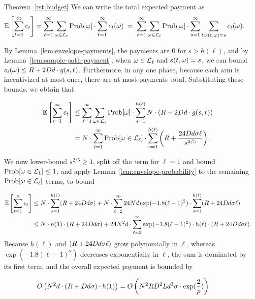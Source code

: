 \begin{extraproof}{Theorem~\ref{rst:budget}}
We can write the total expected payment as
\begin{align*}
  \Expect{\sum_{t=1}^{\infty} \PayA{t}}
& = \sum_{\ell = 1}^{\infty} \sum_{\SP \in \Env{\ell}}
  \Prob{\SP} \cdot \sum_{t=1}^{\infty} \PayA{t}(\SP)
\; = \; \sum_{\ell = 1}^{\infty} \sum_{\SP \in \Env{\ell}}
  \Prob{\SP} \cdot \sum_{s=1}^{\infty} \sum_{t: s(t,\SP) = s} \PayA{t}(\SP).
\end{align*}

By Lemma~\ref{lem:envelope-payments},
the payments are 0 for $s > h(\ell)$,
and by Lemma~\ref{lem:sample-path-payment},
when $\omega \in {\mathcal L}_{\ell}$ and $s(t,\omega) = s$, we can bound
$c_{t}(\omega) \leq R + 2 D d \cdot g(s,\ell)$.
Furthermore, in any one phase, because each arm is incentivized at
most once, there are at most \ARMNUM payments total.
Substituting these bounds, we obtain that

\begin{align*}
  \Expect{\sum_{t=1}^{\infty} \PayA{t}}
& \leq \sum_{\ell = 1}^{\infty} \sum_{\SP \in \Env{\ell}} \Prob{\SP} \cdot
  \sum_{s=1}^{h(\ell)} \ARMNUM \cdot (\MAXR + 2 \Diam d \cdot g(s,\ell))
\\ & = \ARMNUM \cdot
  \sum_{\ell = 1}^{\infty} \Prob{\SP \in \Env{\ell}} \cdot
  \sum_{s=1}^{h(\ell)} \left( \MAXR + \frac{24 \Diam d \sigma \ell}{s^{2/5}} \right).
\end{align*}

We now lower-bound $s^{2/5} \geq 1$, split off the term for $\ell=1$
and bound $\Prob{\SP \in \Env{1}} \leq 1$, and apply
Lemma~\ref{lem:envelope-probability} to the remaining
$\Prob{\SP \in \Env{\ell}}$ terms, to bound

\begin{align*}
\Expect{\sum_{t=1}^{\infty} \PayA{t}}
& \leq
\ARMNUM \cdot \sum_{s=1}^{h(1)} (\MAXR + 24 \Diam d \sigma)
+ \ARMNUM \cdot
  \sum_{\ell = 2}^{\infty} 24 \ARMNUM d\exp(-1.8(\ell-1)^2) \cdot
  \sum_{s=1}^{h(\ell)} (\MAXR + 24 \Diam d \sigma \ell)
\\ & \leq
\ARMNUM \cdot h(1) \cdot (\MAXR + 24 \Diam d \sigma)
+ 24 \ARMNUM^2 d \cdot \sum_{\ell = 2}^{\infty}
     \exp(-1.8(\ell-1)^2) \cdot h(\ell) \cdot (\MAXR + 24 \Diam d \sigma \ell).
\end{align*}
Because $h(\ell)$ and $(R + 24 D d \sigma \ell)$ grow
polynomially in $\ell$, whereas $\exp(-1.8(\ell-1)^2)$ decreases
exponentially in $\ell$, the sum is dominated by its first term, and
the overall expected payment is bounded by

\begin{align*}
O \left(N^2 d \cdot (R + D d \sigma) \cdot h(1) \right)
& = 
O \left(N^2 R D^2 L d^3 \sigma
\cdot \exp(\frac{2}{p}) \right).
\end{align*}
\end{extraproof}
